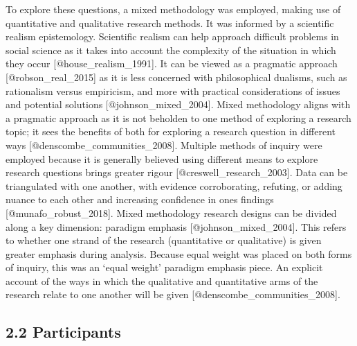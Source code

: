 \documentclass[
]{article}
\begin{document}
To explore these questions, a mixed methodology was employed, making use
of quantitative and qualitative research methods. It was informed by a
scientific realism epistemology. Scientific realism can help approach
difficult problems in social science as it takes into account the
complexity of the situation in which they occur
{[}@house\_realism\_1991{]}. It can be viewed as a pragmatic approach
{[}@robson\_real\_2015{]} as it is less concerned with philosophical
dualisms, such as rationalism versus empiricism, and more with practical
considerations of issues and potential solutions
{[}@johnson\_mixed\_2004{]}. Mixed methodology aligns with a pragmatic
approach as it is not beholden to one method of exploring a research
topic; it sees the benefits of both for exploring a research question in
different ways {[}@denscombe\_communities\_2008{]}. Multiple methods of
inquiry were employed because it is generally believed using different
means to explore research questions brings greater rigour
{[}@creswell\_research\_2003{]}. Data can be triangulated with one
another, with evidence corroborating, refuting, or adding nuance to each
other and increasing confidence in ones findings
{[}@munafo\_robust\_2018{]}. Mixed methodology research designs can be
divided along a key dimension: paradigm emphasis
{[}@johnson\_mixed\_2004{]}. This refers to whether one strand of the
research (quantitative or qualitative) is given greater emphasis during
analysis. Because equal weight was placed on both forms of inquiry, this
was an `equal weight' paradigm emphasis piece. An explicit account of
the ways in which the qualitative and quantitative arms of the research
relate to one another will be given {[}@denscombe\_communities\_2008{]}.

\hypertarget{participants}{%
\subsection{2.2 Participants}\label{participants}}
\end{document}
